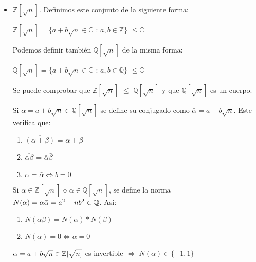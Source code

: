 \begin{itemize}
\item $\mathbb{Z}[\sqrt{n}]$.
Definimos este conjunto de la siguiente forma:
\begin{center}$\mathbb{Z}[\sqrt{n}] = \{a+b\sqrt{n} \in \mathbb{C}$ : $a,b \in \mathbb{Z} \}$ $\leq \mathbb{C}$\end{center}

Podemos definir también $\mathbb{Q}[\sqrt{n}]$ de la misma forma:

\begin{center}$\mathbb{Q}[\sqrt{n}] = \{a+b\sqrt{n} \in \mathbb{C}$ : $a,b \in \mathbb{Q} \}$ $\leq \mathbb{C}$\end{center}

Se puede comprobar que $\mathbb{Z}[\sqrt{n}]$ $\leq$ $\mathbb{Q}[\sqrt{n}]$ y que $\mathbb{Q}[\sqrt{n}]$ es un cuerpo.

\begin{ndef}[Conjugado]
	Si $\alpha = a+b\sqrt{n}\in \mathbb{Q}[\sqrt{n}]$ se define su conjugado como $\bar{\alpha} = a - b\sqrt{n}$. Este verifica que:
\begin{enumerate}

\item $ \overline{(\alpha+ \beta)} $ = $\bar{\alpha} + \bar{\beta}$
\item $\overline{\alpha \beta}$ = $\bar{\alpha}\bar{\beta}$
\item $\alpha = \bar{\alpha} \Leftrightarrow b = 0$

\end{enumerate}
\end{ndef}

\begin{ndef}[Norma]
	Si $\alpha \in \mathbb{Z}[\sqrt{n}]$ o $\alpha \in \mathbb{Q}[\sqrt{n}]$, se define la norma $N(\alpha) = \alpha \bar{\alpha} = a^2 - nb^2 \in \mathbb{Q} $. Así:
\begin{enumerate}
	\item $N(\alpha \beta) = N(\alpha) * N(\beta)$
	\item $N(\alpha) = 0 \iff \alpha = 0$
\end{enumerate}
\end{ndef}


\begin{nprop}
	$\alpha = a + b \sqrt{n} \in \mathbb{Z}[\sqrt{n]}$ es invertible $\iff$ $N(\alpha) \in \{-1,1\}$
\end{nprop}

\end{itemize}

